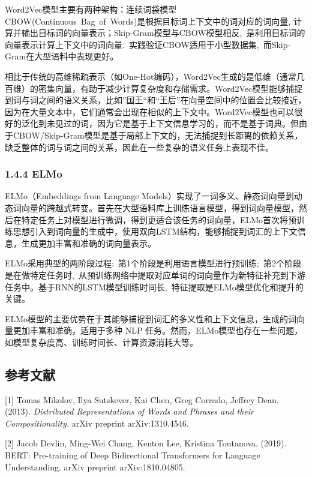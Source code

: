 \documentclass[12pt,a4paper]{book}
\begin{document}
Word2Vec模型主要有两种架构：连续词袋模型CBOW(Continuous~Bag~of~Words)是根据目标词上下文中的词对应的词向量,
计算并输出目标词的向量表示；Skip-Gram模型与CBOW模型相反,~是利用目标词的向量表示计算上下文中的词向量.~实践验证CBOW适用于小型数据集,~而Skip-Gram在大型语料中表现更好。

相比于传统的高维稀疏表示（如One-Hot编码），Word2Vec生成的是低维（通常几百维）的密集向量，有助于减少计算复杂度和存储需求。Word2Vec模型能够捕捉到词与词之间的语义关系，比如''国王``和``王后''在向量空间中的位置会比较接近，因为在大量文本中，它们通常会出现在相似的上下文中。Word2Vec模型也可以很好的泛化到未见过的词，因为它是基于上下文信息学习的，而不是基于词典。但由于CBOW/Skip-Gram模型是基于局部上下文的，无法捕捉到长距离的依赖关系，缺乏整体的词与词之间的关系，因此在一些复杂的语义任务上表现不佳。

\subsubsection{1.4.4 ELMo}\label{elmo}

ELMo（Embeddings from Language
Models）实现了一词多义、静态词向量到动态词向量的跨越式转变。首先在大型语料库上训练语言模型，得到词向量模型，然后在特定任务上对模型进行微调，得到更适合该任务的词向量，ELMo首次将预训练思想引入到词向量的生成中，使用双向LSTM结构，能够捕捉到词汇的上下文信息，生成更加丰富和准确的词向量表示。

ELMo采用典型的两阶段过程:~第1个阶段是利用语言模型进行预训练;~第2个阶段是在做特定任务时,~从预训练网络中提取对应单词的词向量作为新特征补充到下游任务中。基于RNN的LSTM模型训练时间长,~特征提取是ELMo模型优化和提升的关键。

ELMo模型的主要优势在于其能够捕捉到词汇的多义性和上下文信息，生成的词向量更加丰富和准确，适用于多种
NLP
任务。然而，ELMo模型也存在一些问题，如模型复杂度高、训练时间长、计算资源消耗大等。

\subsection{参考文献}\label{ux53c2ux8003ux6587ux732e}

{[}1{]} Tomas Mikolov, Ilya Sutskever, Kai Chen, Greg Corrado, Jeffrey
Dean. (2013). \emph{Distributed Representations of Words and Phrases and
their Compositionality.} arXiv preprint arXiv:1310.4546.

{[}2{]} Jacob Devlin, Ming-Wei Chang, Kenton Lee, Kristina Toutanova.
(2019). BERT: Pre-training of Deep Bidirectional Transformers for
Language Understanding. arXiv preprint arXiv:1810.04805.
\end{document}
